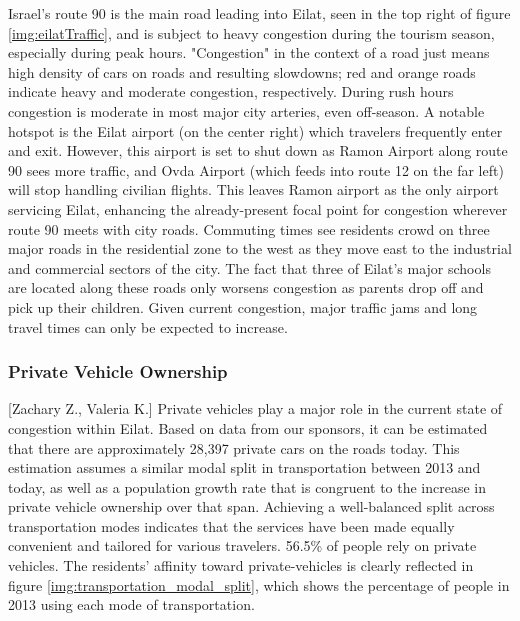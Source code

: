 \documentclass[12pt]{article}                               %
\begin{document}
Israel's route 90 is the main road leading into Eilat, seen in the top right of figure \ref{img:eilatTraffic}, and is subject to heavy congestion during the tourism season, especially during peak hours. "Congestion" in the context of a road just means high density of cars on roads and resulting slowdowns; red and orange roads indicate heavy and moderate congestion, respectively. During rush hours congestion is moderate in most major city arteries, even off-season. A notable hotspot is the Eilat airport (on the center right) which travelers frequently enter and exit. However, this airport is set to shut down as Ramon Airport along route 90 sees more traffic, and Ovda Airport (which feeds into route 12 on the far left) will stop handling civilian flights. This leaves Ramon airport as the only airport servicing Eilat, enhancing the already-present focal point for congestion wherever route 90 meets with city roads. Commuting times see residents crowd on three major roads in the residential zone to the west as they move east to the industrial and commercial sectors of the city. The fact that three of Eilat's major schools are located along these roads only worsens congestion as parents drop off and pick up their children. Given current congestion, major traffic jams and long travel times can only be expected to increase.

\subsubsection{Private Vehicle Ownership}[Zachary Z., Valeria K.]
Private vehicles play a major role in the current state of congestion within Eilat. Based on data from our sponsors, it can be estimated that there are approximately 28,397 private cars on the roads today. This estimation assumes a similar modal split in transportation between 2013 and today, as well as a population growth rate that is congruent to the increase in private vehicle ownership over that span. Achieving a well-balanced split across transportation modes indicates that the services have been made equally convenient and tailored for various travelers. 56.5\% of people rely on private vehicles. The residents' affinity toward private-vehicles is clearly reflected in figure \ref{img:transportation_modal_split}, which shows the percentage of people in 2013 using each mode of transportation.
\end{document}
